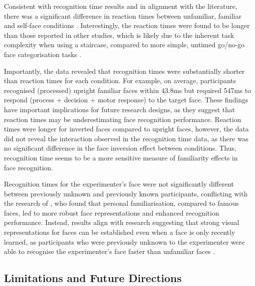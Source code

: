 \documentclass[
  10pt,
  letterpaper,
]{article}
\begin{document}
Consistent with recognition time results and in alignment with the
literature, there was a significant difference in reaction times between
unfamiliar, familiar and self-face conditions
\citep{kloth2006a, ramon2011a, young2017a}. Interestingly, the reaction
times were found to be longer than those reported in other studies,
which is likely due to the inherent task complexity when using a
staircase, compared to more simple, untimed go/no-go face categorisation
tasks \citep{bortolon2017a, burton2016a, ramon2011a, smith2016a}.

Importantly, the data revealed that recognition times were substantially
shorter than reaction times for each condition. For example, on average,
participants recognised (processed) upright familiar faces within 43.8ms
but required 547ms to respond (process + decision + motor response) to
the target face. These findings have important implications for future
research designs, as they suggest that reaction times may be
underestimating face recognition performance. Reaction times were longer
for inverted faces compared to upright faces, however, the data did not
reveal the interaction observed in the recognition time data, as there
was no significant difference in the face inversion effect between
conditions. Thus, recognition time seems to be a more sensitive measure
of familiarity effects in face recognition.

Recognition times for the experimenter's face were not significantly
different between previously unknown and previously known participants,
conflicting with the research of \citet{ambrus2021a}, who found that
personal familiarisation, compared to famous faces, led to more robust
face representations and enhanced recognition performance. Instead,
results align with research suggesting that strong visual
representations for faces can be established even when a face is only
recently learned, as participants who were previously unknown to the
experimenter were able to recognise the experimenter's face faster than
unfamiliar faces \citep{dowsett2016a, kramer2018a, murphy2015a}.

\subsection{Limitations and Future
Directions}\label{limitations-and-future-directions}
\end{document}
